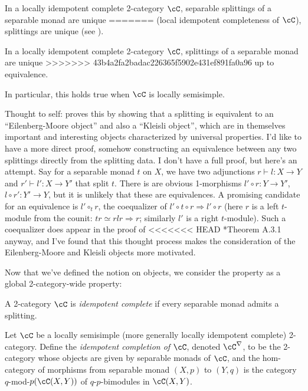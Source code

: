 \documentclass[12pt]{article}
\begin{document}
\begin{proposition}
\label{p:splitting-unique}
In a locally idempotent complete 2-category $\cC$,
separable splittings of a separable monad are unique
=======
(local idempotent completeness of $\cC$), splittings are unique
(see ).




\begin{proposition}
\label{p:splitting-unique}
In a locally idempotent complete 2-category $\cC$,
splittings of a separable monad are unique
>>>>>>> 43b4a2fa2badac226365f5902e431ef891fa0a96
up to equivalence.
\end{proposition}

In particular, this holds true when $\cC$
is locally semisimple.

Thought to self:
\cite{DRfusion} proves this by showing that
a splitting is equivalent
to an ``Eilenberg-Moore object'' and also a ``Kleisli object'',
which are in themselves important and interesting objects
characterized by universal properties.
I'd like to have a more direct proof,
somehow constructing an equivalence between any two splittings
directly from the splitting data.
I don't have a full proof, but here's an attempt.
Say for a separable monad $t$ on $X$,
we have two adjunctions $r \vdash l : X \to Y$
and $r' \vdash l' : X \to Y'$
that split $t$.
There is are obvious 1-morphisms $l' \circ r: Y \to Y'$,
$l \circ r': Y' \to Y$,
but it is unlikely that these are equivalences.
A promising candidate for an equivalence
is $l' \circ_t r$, the coequalizer of
$l' \circ t \circ r \Rightarrow l' \circ r$
(here $r$ is a left $t$-module from the counit:
$tr \simeq rlr \Rightarrow r$;
similarly $l'$ is a right $t$-module).
Such a coequalizer does appear in the proof of
<<<<<<< HEAD
\cite{DRfusion}*{Theorem A.3.1} anyway,
and I've found that this thought process
makes the consideration of the Eilenberg-Moore and Kleisli
objects more motivated.


Now that we've defined the notion on objects,
we consider the property as a global 2-category-wide property:


\begin{definition}
A 2-category $\cC$ is \emph{idempotent complete}
if every separable monad admits a splitting.
\end{definition}

\begin{definition}
Let $\cC$ be a locally semisimple
(more generally locally idempotent complete)
2-category.
Define the \emph{idempotent completion of $\cC$},
denoted $\cC^\nabla$, to be the 2-category whose objects
are given by separable monads of $\cC$,
and the hom-category of morphisms from
separable monad $(X,p)$ to $(Y,q)$
is the category $q$-mod-$p(\cC(X,Y))$
of $q$-$p$-bimodules in $\cC(X,Y)$.


\end{definition}
\end{proposition}
\end{document}
